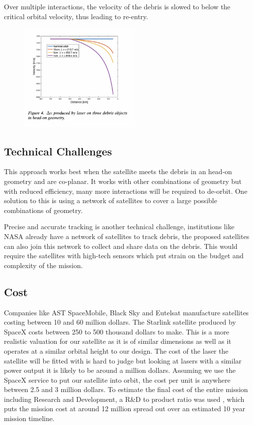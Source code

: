 \documentclass{article}
\begin{document}
Over multiple interactions, the velocity of the debris is slowed to below the critical orbital velocity, thus leading to re-entry.

        \begin{figure}[htp]
            \centering
            \includegraphics[width=6cm]{Images/NominalOrbit.png}
            \label{fig:EYH}
        \end{figure}
        
\subsection{Technical Challenges}
This approach works best when the satellite meets the debris in an head-on geometry and are co-planar. It works with other combinations of geometry but with reduced efficiency, many more interactions will be required to de-orbit. One solution to this is using a network of satellites to cover a large possible combinations of geometry.

Precise and accurate tracking is another technical challenge, institutions like NASA already have a network of satellites to track debris, the proposed satellites can also join this network to collect and share data on the debris. This would require the satellites with high-tech sensors which put strain on the budget and complexity of the mission.
\subsection{Cost}
Companies like AST SpaceMobile, Black Sky and Eutelsat manufacture satellites costing between 10 and 60 million dollars. The Starlink satellite produced by SpaceX costs between 250 to 500 thousand dollars to make. This is a more realistic valuation for our satellite as it is of similar dimensions as well as it operates at a similar orbital height to our design. The cost of the laser the satellite will be fitted with is hard to judge but looking at lasers with a similar power output it is likely to be around a million dollars. Assuming we use the SpaceX service to put our satellite into orbit, the cost per unit is anywhere between 2.5 and 3 million dollars. To estimate the final cost of the entire mission including Research and Development, a R\&D to product ratio was used \cite{RD}, which puts the mission cost at around 12 million spread out over an estimated 10 year mission timeline.
\end{document}
